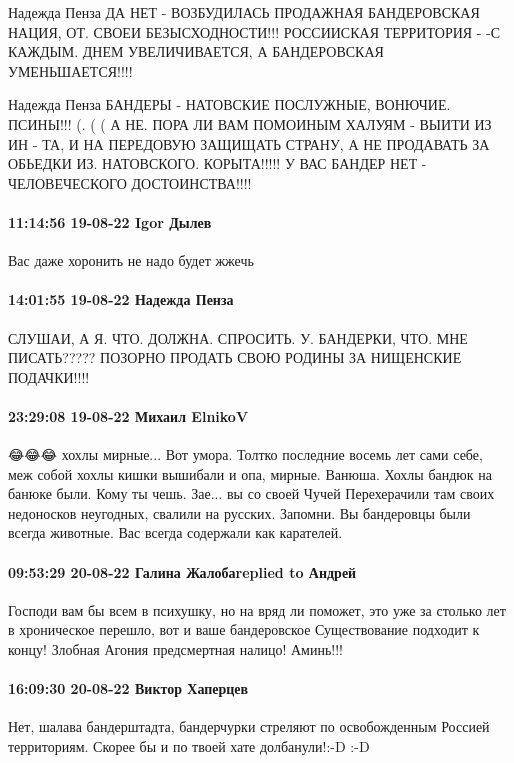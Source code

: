 Надежда Пенза
ДА НЕТ - ВОЗБУДИЛАСЬ ПРОДАЖНАЯ БАНДЕРОВСКАЯ НАЦИЯ, ОТ. СВОЕИ БЕЗЫСХОДНОСТИ!!!
РОССИИСКАЯ ТЕРРИТОРИЯ - -С КАЖДЫМ. ДНЕМ УВЕЛИЧИВАЕТСЯ, А БАНДЕРОВСКАЯ УМЕНЬШАЕТСЯ!!!!

Надежда Пенза
БАНДЕРЫ - НАТОВСКИЕ ПОСЛУЖНЫЕ, ВОНЮЧИЕ. ПСИНЫ!!! (. ( ( А НЕ. ПОРА ЛИ ВАМ ПОМОИНЫМ ХАЛУЯМ - ВЫИТИ ИЗ ИН - ТА, И НА ПЕРЕДОВУЮ ЗАЩИЩАТЬ СТРАНУ, А НЕ ПРОДАВАТЬ ЗА ОБЬЕДКИ ИЗ. НАТОВСКОГО. КОРЫТА!!!!! У ВАС БАНДЕР НЕТ - ЧЕЛОВЕЧЕСКОГО ДОСТОИНСТВА!!!!

\paragraph{11:14:56 19-08-22 Igor Дылев}

Вас даже хоронить не надо будет жжечь

\paragraph{14:01:55 19-08-22 Надежда Пенза}

СЛУШАИ, А Я. ЧТО. ДОЛЖНА. СПРОСИТЬ. У. БАНДЕРКИ, ЧТО. МНЕ ПИСАТЬ????? ПОЗОРНО
ПРОДАТЬ СВОЮ РОДИНЫ ЗА НИЩЕНСКИЕ ПОДАЧКИ!!!!

\paragraph{23:29:08 19-08-22 Михаил ElnikoV}

😂😂😂 хохлы мирные... Вот умора. Толтко последние восемь лет сами себе, меж собой хохлы кишки вышибали и опа, мирные.
Ванюша. Хохлы бандюк на банюке были. Кому ты чешь.
Зае... вы со своей Чучей
Перехерачили там своих недоносков неугодных, свалили на русских.
Запомни. Вы бандеровцы были всегда животные. Вас всегда содержали как карателей.

\paragraph{09:53:29 20-08-22 Галина Жалобаreplied to Андрей}

Господи вам бы всем в психушку, но на вряд ли поможет, это уже за столько лет в
хроническое перешло, вот и ваше бандеровское Существование подходит к концу!
Злобная Агония предсмертная налицо! Аминь!!!

\paragraph{16:09:30 20-08-22 Виктор Хаперцев}

Нет, шалава бандерштадта, бандерчурки стреляют по освобожденным Россией территориям.
Скорее бы и по твоей хате долбанули!:-D :-D


